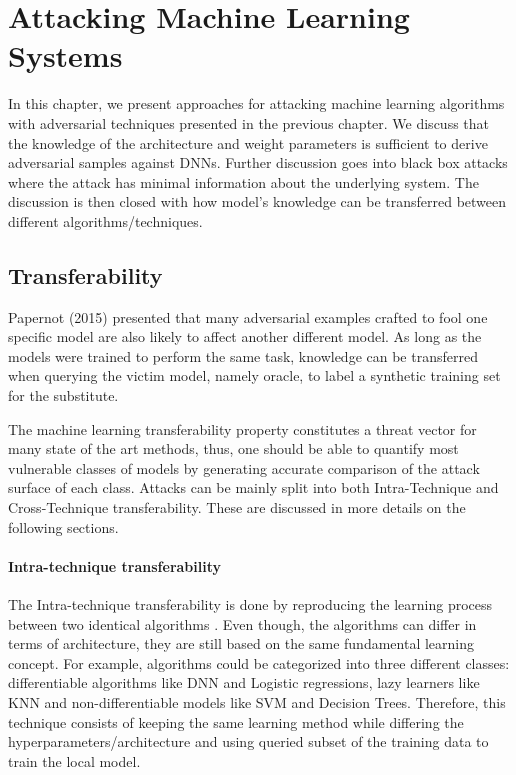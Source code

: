 \chapter{Attacking Machine Learning Systems}

In this chapter, we present approaches for attacking machine learning algorithms with adversarial techniques presented in the previous chapter. We discuss that the knowledge of the architecture and weight parameters is sufficient to derive adversarial samples against DNNs. Further discussion goes into black box attacks where the attack has minimal information about the underlying system. The discussion is then closed with how model's knowledge can be transferred between different algorithms/techniques.


\section{Transferability}

Papernot (2015) presented that many adversarial examples crafted to fool one specific model are also likely to affect another different model. As long as the models were trained to perform the same task, knowledge can be transferred when querying the victim model, namely oracle, to label a synthetic training set for the substitute.

The machine learning transferability property constitutes a threat vector for many state of the art methods, thus, one should be able to quantify most vulnerable classes of models by generating accurate comparison of the attack surface of each class. Attacks can be mainly split into both Intra-Technique and Cross-Technique transferability. These are discussed in more details on the following sections.

\subsubsection{Intra-technique transferability}\label{subsubsec:intra}

The Intra-technique transferability is done by reproducing the learning process between two identical algorithms \cite{papernot2016transf}. Even though, the algorithms can differ in terms of architecture, they are still based on the same fundamental learning concept. For example, algorithms could be categorized into three different classes: differentiable algorithms like DNN and Logistic regressions, lazy learners like KNN and non-differentiable models like SVM and Decision Trees. Therefore, this technique consists of keeping the same learning method while differing the hyperparameters/architecture and using queried subset of the training data to train the local model. 



